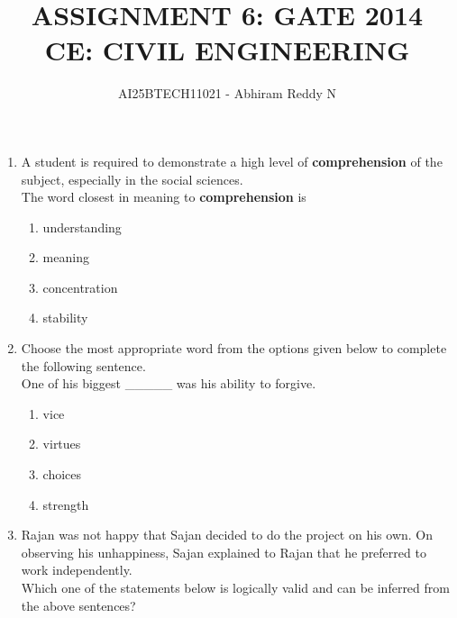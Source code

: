 \documentclass[journal,12pt,onecolumn]{IEEEtran}
\theoremstyle{remark}
\begin{document}
\title{
ASSIGNMENT 6: GATE 2014 \\
CE: CIVIL ENGINEERING}
\author{AI25BTECH11021 - Abhiram Reddy N}
\maketitle


\begin{enumerate} 

\item A student is required to demonstrate a high level of \textbf{comprehension} of the subject, especially in the social sciences.      \hfill{} \\
The word closest in meaning to \textbf{comprehension} is

\begin{multicols}{4}
    
\begin{enumerate}
\item understanding
\item meaning
\item concentration
\item stability
\end{enumerate}
\end{multicols}


\item Choose the most appropriate word from the options given below to complete the following sentence.  \hfill{}  \\
One of his biggest \_\_\_\_\_ was his ability to forgive.
\begin{multicols}{4}
    

\begin{enumerate}
\item vice
\item virtues
\item choices
\item strength
\end{enumerate}
\end{multicols}


\item Rajan was not happy that Sajan decided to do the project on his own. On observing his unhappiness, Sajan explained to Rajan that he preferred to work independently.    \hfill{}  \\
Which one of the statements below is logically valid and can be inferred from the above sentences?
\begin{multicols}{4}
    


\end{multicols}
\end{enumerate}
\end{document}
